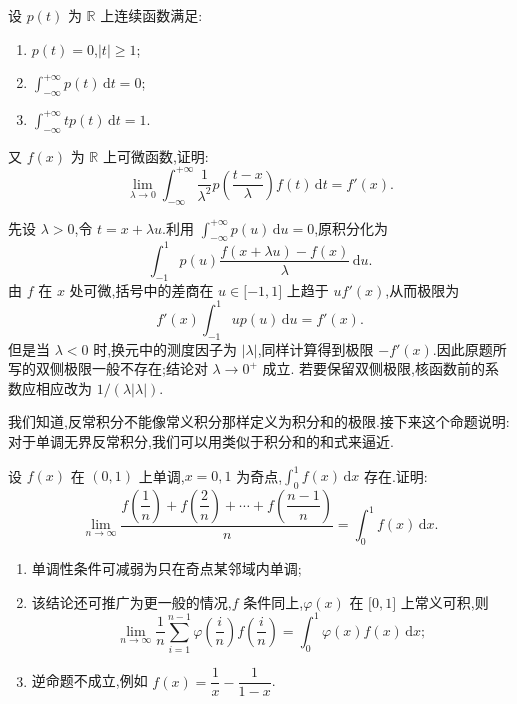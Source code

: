 \begin{example}
  设 $p(t)$ 为 $\mathbb{R}$ 上连续函数满足:
  \begin{enumerate}
    \item $p(t)=0$,$|t|\geq1$;
    \item $\displaystyle\int_{-\infty}^{+\infty}p(t)\,\mathrm{d}t=0$;
    \item $\displaystyle\int_{-\infty}^{+\infty}tp(t)\,\mathrm{d}t=1$.
  \end{enumerate}
  又 $f(x)$ 为 $\mathbb{R}$ 上可微函数,证明:
  \[
    \lim\limits_{\lambda\to0}\int_{-\infty}^{+\infty}
    \dfrac{1}{\lambda^2}p\left(\dfrac{t-x}{\lambda}\right)f(t)\,\mathrm{d}t
    =f'(x).
  \]
\end{example}
\exampleblank

\begin{solution}
  先设 $\lambda>0$,令 $t=x+\lambda u$.利用
  $\displaystyle\int_{-\infty}^{+\infty}p(u)\,\mathrm{d}u=0$,原积分化为
  \[
    \int_{-1}^{1}p(u)\dfrac{f(x+\lambda u)-f(x)}{\lambda}\,\mathrm{d}u.
  \]
  由 $f$ 在 $x$ 处可微,括号中的差商在 $u\in\lbrack-1,1\rbrack$ 上趋于
  $u f'(x)$,从而极限为
  \[
    f'(x)\int_{-1}^{1}up(u)\,\mathrm{d}u=f'(x).
  \]
  但是当 $\lambda<0$ 时,换元中的测度因子为 $|\lambda|$,同样计算得到极限
  $-f'(x)$.因此原题所写的双侧极限一般不存在;结论对 $\lambda\to0^+$ 成立.
  若要保留双侧极限,核函数前的系数应相应改为 $1/(\lambda|\lambda|)$.
\end{solution}

我们知道,反常积分不能像常义积分那样定义为积分和的极限.接下来这个命题说明:对于单调无界反常积分,我们可以用类似于积分和的和式来逼近.

\begin{proposition}[\markstar]
  设 $f(x)$ 在 $(0,1)$ 上单调,$x=0,1$ 为奇点,$\displaystyle\int_0^1f(x)\,\mathrm{d}x$ 存在.证明:
  \[
    \lim\limits_{n\to\infty}
    \dfrac{f\left(\dfrac{1}{n}\right)+f\left(\dfrac{2}{n}\right)+\cdots+f\left(\dfrac{n-1}{n}\right)}{n}
    =\int_0^1f(x)\,\mathrm{d}x.
  \]
\end{proposition}

\begin{remark}
  \begin{enumerate}
    \item 单调性条件可减弱为只在奇点某邻域内单调;
    \item 该结论还可推广为更一般的情况,$f$ 条件同上,$\varphi(x)$ 在 $\lbrack 0,1\rbrack$ 上常义可积,则
          \[
            \lim\limits_{n\to\infty}\dfrac{1}{n}\sum\limits_{i=1}^{n-1}
            \varphi\left(\dfrac{i}{n}\right)f\left(\dfrac{i}{n}\right)
            =\int_0^1\varphi(x)f(x)\,\mathrm{d}x;
          \]
    \item 逆命题不成立,例如 $f(x)=\dfrac{1}{x}-\dfrac{1}{1-x}$.
  \end{enumerate}
\end{remark}

